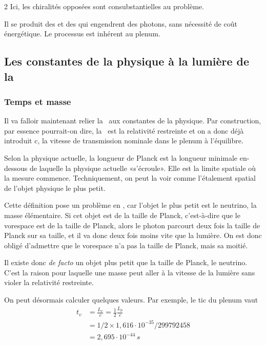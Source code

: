 \begin{multicols}{2}
Ici, les chiralités opposées sont consubstantielles au problème.

Il se produit des  et des  qui engendrent des photons,
sans nécessité de coût énergétique. Le processus est inhérent au plenum.

\subsection{Les constantes de la physique à la lumière de la \PQ}

\subsubsection{Temps et masse}

Il va falloir maintenant relier la \PQ\ aux constantes de la physique.
Par construction, par essence pourrait-on dire, la \PQ\ est la
relativité restreinte et on a donc déjà introduit c, la vitesse de
transmission nominale dans le plenum à l'équilibre.

Selon la physique actuelle, la longueur de Planck est la longueur
minimale en-dessous de laquelle la physique actuelle «s'écroule».
Elle est la limite spatiale où la mesure commence. Techniquement, on
peut la voir comme l'étalement spatial de l'objet physique le plus
petit.

Cette définition pose un problème en \PQ, car l'objet le plus petit est
le neutrino, la masse élémentaire. Si cet objet est de la taille de
Planck, c'est-à-dire que le vorespace est de la taille de Planck,
alors le photon parcourt deux fois la taille de Planck sur sa taille,
et il va donc deux fois moins vite que la lumière. On est donc
obligé d'admettre que le vorespace n'a pas la taille de Planck, mais
sa moitié.

Il existe donc \textit{de facto} un objet plus petit que la taille de Planck,
le neutrino. C'est la raison pour laquelle une masse peut aller à la
vitesse de la lumière sans violer la relativité restreinte.
\medskip

On peut désormais calculer quelques valeurs. Par exemple, le tic du
plenum vaut
\begin{equation*}
	\begin{split}
    t_v &= \frac {L_v}{c} = \frac{1}{2} \frac{L_p}{c} \\
        &= 1/2 \times 1,616 \cdot 10^{-35} /299 792 458 \\
        &= 2,695 \cdot 10^{-44}\,s
	\end{split}
\end{equation*}


\end{multicols}
